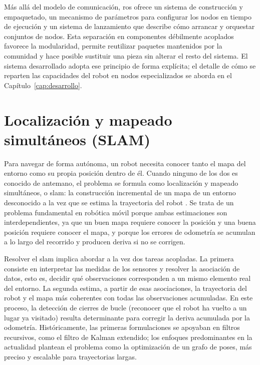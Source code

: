 Más allá del modelo de comunicación, \gls{ros} ofrece un sistema de construcción
y empaquetado, un mecanismo de parámetros para configurar los nodos en tiempo de
ejecución y un sistema de lanzamiento que describe cómo arrancar y orquestar
conjuntos de nodos. Esta separación en componentes débilmente acoplados favorece
la modularidad, permite reutilizar paquetes mantenidos por la comunidad y hace
posible sustituir una pieza sin alterar el resto del sistema. 
El sistema desarrollado adopta ese principio de forma explícita; el detalle de cómo
se reparten las capacidades del robot en nodos especializados se aborda en el
Capítulo~\ref{cap:desarrollo}.

\section{Localización y mapeado simultáneos (SLAM)}
\label{sec:slam}

Para navegar de forma autónoma, un robot necesita conocer tanto el mapa del
entorno como su propia posición dentro de él. Cuando ninguno de los dos es
conocido de antemano, el problema se formula como localización y mapeado
simultáneos, o \gls{slam}: la construcción incremental de un mapa de un entorno
desconocido a la vez que se estima la trayectoria del robot
\parencite{durrantwhyte2006slam}. Se trata de un problema fundamental en
robótica móvil porque ambas estimaciones son interdependientes, ya que un buen
mapa requiere conocer la posición y una buena posición requiere conocer el mapa,
y porque los errores de odometría se acumulan a lo largo del recorrido y
producen deriva si no se corrigen.

Resolver el \gls{slam} implica abordar a la vez dos tareas acopladas. La primera
consiste en interpretar las medidas de los sensores y resolver la asociación de
datos, esto es, decidir qué observaciones corresponden a un mismo elemento real
del entorno. La segunda estima, a partir de esas asociaciones, la trayectoria del
robot y el mapa más coherentes con todas las observaciones acumuladas. En este
proceso, la detección de cierres de bucle (reconocer que el robot ha vuelto a un
lugar ya visitado) resulta determinante para corregir la deriva acumulada por la
odometría. Históricamente, las primeras formulaciones se apoyaban en filtros
recursivos, como el filtro de Kalman extendido; los enfoques predominantes en la
actualidad plantean el problema como la optimización de un grafo de poses, más
preciso y escalable para trayectorias largas.

